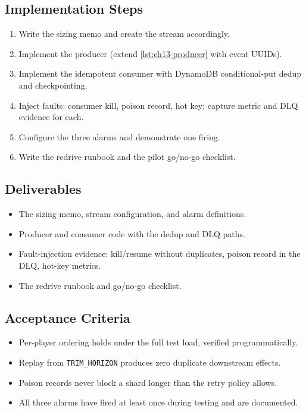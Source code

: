 \subsection*{Implementation Steps}
\begin{enumerate}
    \item Write the sizing memo and create the stream accordingly.
    \item Implement the producer (extend \cref{lst:ch13-producer} with event UUIDs).
    \item Implement the idempotent consumer with DynamoDB conditional-put dedup and checkpointing.
    \item Inject faults: consumer kill, poison record, hot key; capture metric and DLQ evidence for each.
    \item Configure the three alarms and demonstrate one firing.
    \item Write the redrive runbook and the pilot go/no-go checklist.
\end{enumerate}

\subsection*{Deliverables}
\begin{itemize}
    \item The sizing memo, stream configuration, and alarm definitions.
    \item Producer and consumer code with the dedup and DLQ paths.
    \item Fault-injection evidence: kill/resume without duplicates, poison record in the DLQ, hot-key metrics.
    \item The redrive runbook and go/no-go checklist.
\end{itemize}

\subsection*{Acceptance Criteria}
\begin{itemize}
    \item Per-player ordering holds under the full test load, verified programmatically.
    \item Replay from \texttt{TRIM\_HORIZON} produces zero duplicate downstream effects.
    \item Poison records never block a shard longer than the retry policy allows.
    \item All three alarms have fired at least once during testing and are documented.
\end{itemize}


